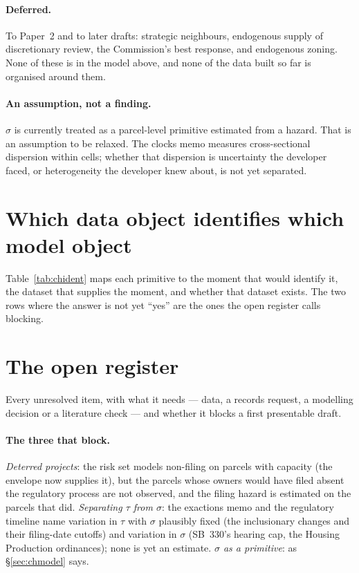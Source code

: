 \documentclass[11pt]{article}
\newcommand{\chtable}[1]{\FloatBarrier\def\chtab{#1}}
\begin{document}
\paragraph{Deferred.} To Paper~2 and to later drafts: strategic neighbours, endogenous supply of
discretionary review, the Commission's best response, and endogenous zoning. None of these is in
the model above, and none of the data built so far is organised around them.

\paragraph{An assumption, not a finding.} $\sigma$ is currently treated as a parcel-level
primitive estimated from a hazard. That is an assumption to be relaxed. The clocks memo measures
cross-sectional dispersion within cells; whether that dispersion is uncertainty the developer
faced, or heterogeneity the developer knew about, is not yet separated.

\section{Which data object identifies which model object}\label{sec:chident}

Table~\ref{tab:chident} maps each primitive to the moment that would identify it, the dataset
that supplies the moment, and whether that dataset exists. The two rows where the answer is not
yet ``yes'' are the ones the open register calls blocking.

\chtable{ident}

\section{The open register}\label{sec:chregister}

Every unresolved item, with what it needs --- data, a records request, a modelling decision or a
literature check --- and whether it blocks a first presentable draft.

\chtable{register}

\paragraph{The three that block.} \emph{Deterred projects}: the risk set models non-filing on
parcels with capacity (the envelope now supplies it), but the parcels whose owners would have
filed absent the regulatory process are not observed, and the filing hazard is estimated on
the parcels that did. \emph{Separating $\tau$ from $\sigma$}: the exactions memo and the
regulatory timeline name variation in $\tau$ with $\sigma$ plausibly fixed (the inclusionary
changes and their filing-date cutoffs) and variation in $\sigma$ (SB~330's hearing cap, the
Housing Production ordinances); none is yet an estimate. \emph{$\sigma$ as a primitive}: as
\S\ref{sec:chmodel} says.
\end{document}
